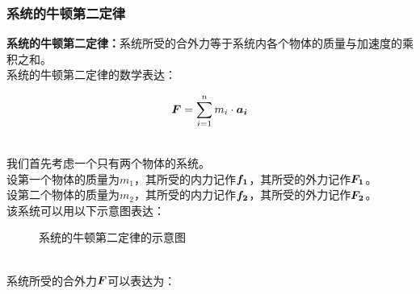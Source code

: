\documentclass[UTF8]{ctexart}
\newcommand*{\veb}[1]{\vb*{#1}}
\begin{document}
\subsubsection{系统的牛顿第二定律}
    \setcounter{equation}{0}
    \textbf{系统的牛顿第二定律：}系统所受的合外力等于系统内各个物体的质量与加速度的乘积之和。\\[3mm]
    系统的牛顿第二定律的数学表达：
    \begin{large}
        \begin{equation*}
            \veb{F}=\sum_{i=1}^n m_i\cdot \veb{a_i}
        \end{equation*}
    \end{large}\\
    我们首先考虑一个只有两个物体的系统。\\[3mm]
    设第一个物体的质量为$m_1$，其所受的内力记作$\veb{f_1}$，其所受的外力记作$\veb{F_1}$。\\[3mm]
    设第二个物体的质量为$m_2$，其所受的内力记作$\veb{f_2}$，其所受的外力记作$\veb{F_2}$。\\[3mm]
    该系统可以用以下示意图表达：
    \begin{figure}[h]
        \begin{center}
            \caption{系统的牛顿第二定律的示意图}
        \end{center}
    \end{figure}\\
    系统所受的合外力$\veb{F}$可以表达为：
\end{document}

